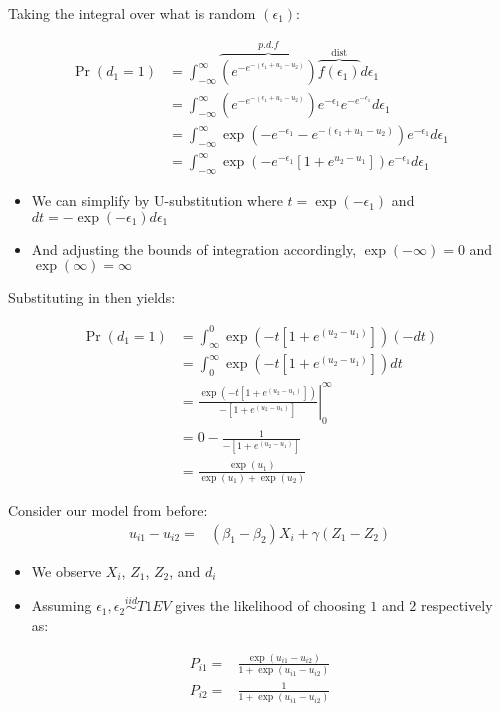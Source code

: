 \documentclass[11pt]{article}
\begin{document}
Taking the integral over what is random \((\epsilon_1)\):

\begin{align*}
\Pr(d_1=1)&=\int_{-\infty}^{\infty}\overbrace{\left(e^{-e^{-(\epsilon_1+u_1-u_2)}}\right)}^{p.d.f}\overbrace{f(\epsilon_1)}^{\text{dist}}d\epsilon_1\\
&=\int_{-\infty}^{\infty}\left(e^{-e^{-(\epsilon_1+u_1-u_2)}}\right)e^{-\epsilon_1}e^{-e^{-\epsilon_1}}d\epsilon_1\\
&=\int_{-\infty}^{\infty}\exp\left(-e^{-\epsilon_1}-e^{-(\epsilon_1+u_1-u_2)}\right)e^{-\epsilon_1}d\epsilon_1\\
&=\int_{-\infty}^{\infty}\exp\left(-e^{-\epsilon_1}\left[1+e^{u_2-u_1}\right]\right)e^{-\epsilon_1}d\epsilon_1
\end{align*}

\begin{itemize}
\item We can simplify by U-substitution where \(t=\exp(-\epsilon_1)\) and \(dt=-\exp(-\epsilon_1)d\epsilon_1\)

\item And adjusting the bounds of integration accordingly, \(\exp(-\infty)=0\) and \(\exp(\infty)=\infty\)
\end{itemize}

Substituting in then yields:

\begin{align*}
\Pr(d_1=1)&=\int_{\infty}^0\exp\left(-t\left[1+e^{(u_2-u_1)}\right]\right)(-dt)\\
&=\int_0^{\infty}\exp\left(-t\left[1+e^{(u_2-u_1)}\right]\right)dt\\
&=\left.\frac{\exp\left(-t\left[1+e^{(u_2-u_1)}\right]\right)}{-\left[1+e^{(u_2-u_1)}\right]}\right\vert^{\infty}_{0}\\
&=0-\frac{1}{-\left[1+e^{(u_2-u_1)}\right]}\\
&=\frac{\exp(u_1)}{\exp(u_1)+\exp(u_2)}
\end{align*}


Consider our model from before:
\begin{align*}
u_{i1}-u_{i2}=&(\beta_1-\beta_2)X_i+\gamma (Z_1-Z_2)
\end{align*}

\begin{itemize}
\item We observe \(X_i\), \(Z_1\), \(Z_2\), and \(d_i\)

\item Assuming \(\epsilon_1,\epsilon_2 \overset{iid}{\sim} T1EV\) gives the likelihood of choosing \(1\) and \(2\) respectively as:
\end{itemize}
\begin{align*}
P_{i1}=&\frac{\exp(u_{i1}-u_{i2})}{1+\exp(u_{i1}-u_{i2})}\\
P_{i2}=&\frac{1}{1+\exp(u_{i1}-u_{i2})}
\end{align*}
\end{document}
